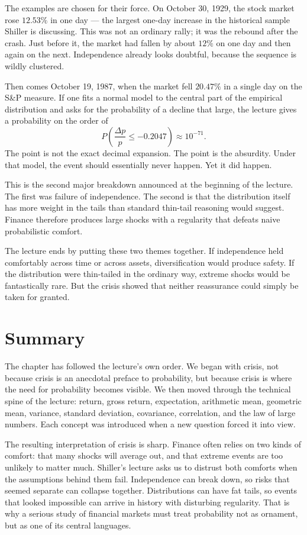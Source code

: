 The examples are chosen for their force. On October 30, 1929, the stock market rose \(12.53\%\) in one day --- the largest one-day increase in the historical sample Shiller is discussing. This was not an ordinary rally; it was the rebound after the crash. Just before it, the market had fallen by about \(12\%\) on one day and then again on the next. Independence already looks doubtful, because the sequence is wildly clustered.

Then comes October 19, 1987, when the market fell \(20.47\%\) in a single day on the S\&P measure. If one fits a normal model to the central part of the empirical distribution and asks for the probability of a decline that large, the lecture gives a probability on the order of
\begin{equation}
P\!\left(\frac{\Delta p}{p}\le -0.2047\right)\approx 10^{-71}.
\end{equation}
The point is not the exact decimal expansion. The point is the absurdity. Under that model, the event should essentially never happen. Yet it did happen.

This is the second major breakdown announced at the beginning of the lecture. The first was failure of independence. The second is that the distribution itself has more weight in the tails than standard thin-tail reasoning would suggest. Finance therefore produces large shocks with a regularity that defeats naive probabilistic comfort.

The lecture ends by putting these two themes together. If independence held comfortably across time or across assets, diversification would produce safety. If the distribution were thin-tailed in the ordinary way, extreme shocks would be fantastically rare. But the crisis showed that neither reassurance could simply be taken for granted.

\section{Summary}

The chapter has followed the lecture's own order. We began with crisis, not because crisis is an anecdotal preface to probability, but because crisis is where the need for probability becomes visible. We then moved through the technical spine of the lecture: return, gross return, expectation, arithmetic mean, geometric mean, variance, standard deviation, covariance, correlation, and the law of large numbers. Each concept was introduced when a new question forced it into view.

The resulting interpretation of crisis is sharp. Finance often relies on two kinds of comfort: that many shocks will average out, and that extreme events are too unlikely to matter much. Shiller's lecture asks us to distrust both comforts when the assumptions behind them fail. Independence can break down, so risks that seemed separate can collapse together. Distributions can have fat tails, so events that looked impossible can arrive in history with disturbing regularity. That is why a serious study of financial markets must treat probability not as ornament, but as one of its central languages.